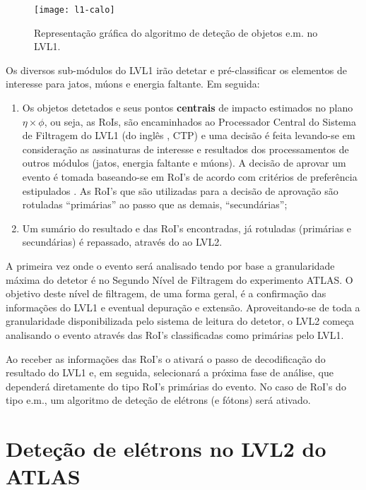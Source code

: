 \begin{figure}
\begin{center}
\texttt{[image: l1-calo]}
\end{center}
\caption{Representação gráfica do algoritmo de deteção de objetos e.m. no LVL1.}
\label{fig:l1-calo}
\end{figure}

Os diversos sub-módulos do LVL1 irão detetar e pré-classificar os elementos de
interesse para jatos, múons e energia faltante. Em seguida:

\begin{enumerate}
\item Os objetos detetados e seus pontos \textbf{centrais} de impacto
estimados no plano $\eta\times\phi$, ou seja, as RoIs, são encaminhados ao
Processador Central do Sistema de Filtragem do LVL1 (do inglês , CTP) e uma decisão é feita levando-se em consideração as
assinaturas de interesse e resultados dos processamentos de outros módulos
(jatos, energia faltante e múons). A decisão de aprovar um evento é tomada
baseando-se em RoI's de acordo com critérios de preferência estipulados . As RoI's que são utilizadas para a decisão de aprovação são rotuladas
``primárias'' ao passo que as demais, ``secundárias'';

\item Um sumário do resultado e das RoI's encontradas, já rotuladas (primárias
e secundárias) é repassado, através do  ao LVL2.
\end{enumerate}

A primeira vez onde o evento será analisado tendo por base a granularidade
máxima do detetor é no Segundo Nível de Filtragem do experimento ATLAS. O
objetivo deste nível de filtragem, de uma forma geral, é a confirmação das
informações do LVL1 e eventual depuração e extensão. Aproveitando-se de toda a
granularidade disponibilizada pelo sistema de leitura do detetor, o LVL2
começa analisando o evento através das RoI's classificadas como primárias pelo
LVL1.

Ao receber as informações das RoI's o  ativará o passo de
decodificação do resultado do LVL1 e, em seguida, selecionará a próxima fase
de análise, que dependerá diretamente do tipo RoI's primárias do evento. No
caso de RoI's do tipo e.m., um algoritmo de deteção de elétrons (e fótons)
será ativado.

\section{Deteção de elétrons no LVL2 do ATLAS}
\label{sec:classic-detection}

